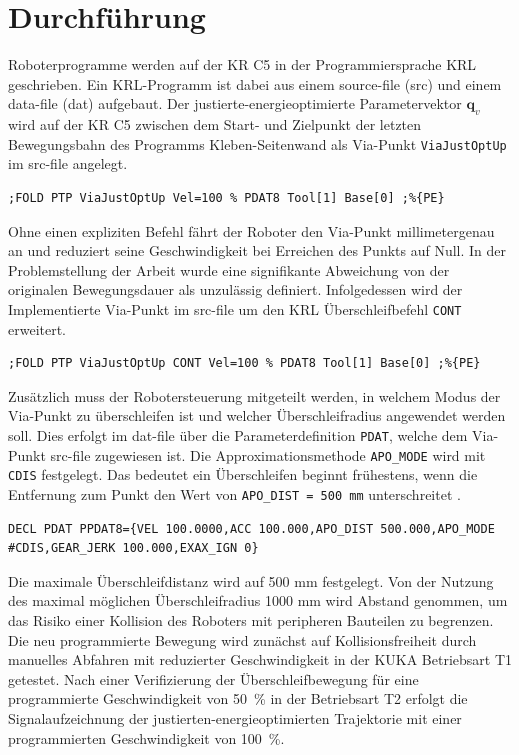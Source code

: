 \section{Durchführung}
Roboterprogramme werden auf der KR C5 in der Programmiersprache KRL geschrieben. Ein KRL-Programm ist dabei aus einem source-file (src) und einem data-file (dat)  aufgebaut. Der justierte-energieoptimierte Parametervektor $\bm{q}_v$ wird auf der KR C5 zwischen dem Start- und Zielpunkt der letzten Bewegungsbahn des Programms Kleben-Seitenwand als Via-Punkt \lstinline|ViaJustOptUp| im src-file angelegt. 
\begin{lstlisting}[numbers=none]
	;FOLD PTP ViaJustOptUp Vel=100 % PDAT8 Tool[1] Base[0] ;%{PE}
\end{lstlisting}
Ohne einen expliziten Befehl fährt der Roboter den Via-Punkt millimetergenau an und reduziert seine Geschwindigkeit bei Erreichen des Punkts auf Null. In der Problemstellung der Arbeit wurde eine signifikante Abweichung von der originalen Bewegungsdauer als unzulässig definiert. 
Infolgedessen wird der Implementierte Via-Punkt im src-file um den KRL Überschleifbefehl \lstinline|CONT| erweitert. 
%
\begin{lstlisting}[numbers=none]
	;FOLD PTP ViaJustOptUp CONT Vel=100 % PDAT8 Tool[1] Base[0] ;%{PE}
\end{lstlisting}
%
Zusätzlich muss der Robotersteuerung mitgeteilt werden, in welchem Modus der Via-Punkt zu überschleifen ist und welcher Überschleifradius angewendet werden soll. Dies erfolgt im dat-file über die Parameterdefinition \lstinline|PDAT|, welche dem Via-Punkt src-file zugewiesen ist. 
Die Approximationsmethode \lstinline|APO_MODE| wird mit \lstinline|CDIS| festgelegt. Das bedeutet ein Überschleifen beginnt frühestens, wenn die Entfernung zum Punkt den Wert von \lstinline|APO_DIST = 500 mm| unterschreitet \cite[S.~578]{KSS.2023}.
\begin{lstlisting}[numbers=none]
	DECL PDAT PPDAT8={VEL 100.0000,ACC 100.000,APO_DIST 500.000,APO_MODE #CDIS,GEAR_JERK 100.000,EXAX_IGN 0}
\end{lstlisting}
Die maximale Überschleifdistanz wird auf 500 mm festgelegt. Von der Nutzung des maximal möglichen Überschleifradius 1000 mm wird Abstand genommen, um das Risiko einer Kollision des Roboters mit peripheren Bauteilen zu begrenzen. Die neu programmierte Bewegung wird zunächst auf Kollisionsfreiheit durch manuelles Abfahren mit reduzierter Geschwindigkeit in der KUKA Betriebsart T1 getestet. Nach einer Verifizierung der Überschleifbewegung für eine programmierte Geschwindigkeit von 50~\% in der Betriebsart T2 erfolgt die Signalaufzeichnung der justierten-energieoptimierten Trajektorie mit einer programmierten Geschwindigkeit von 100~\%. 
%
